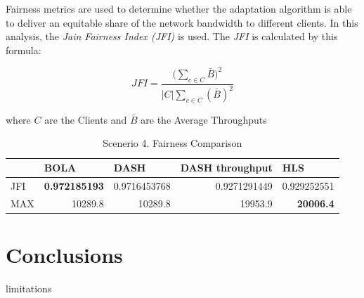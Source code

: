 Fairness metrics are used to determine whether the adaptation 
algorithm is able to deliver an equitable share of the network bandwidth 
to different clients. In this analysis, the \textit{Jain Fairness Index (JFI)}
\cite{jfi} is used. The \textit{JFI} is calculated by this formula:

\begin{equation}
    JFI=\frac{\bigg(\sum\limits_{c\in C}\bar{B}\bigg)^2}{\left | C \right |\sum\limits_{c\in C}(\bar{B})^2}
\end{equation}

where  $C$ are the Clients and $\bar{B}$ are the Average Throughputs

\begin{table}[]
    \centering
    \begin{tabular}{@{}lrrrr@{}}
    \toprule
        & \multicolumn{1}{l}{BOLA} & \multicolumn{1}{l}{DASH} & \multicolumn{1}{l}{DASH throughput} & \multicolumn{1}{l}{HLS} \\ \midrule
    JFI & \textbf{0.972185193}     & 0.9716453768             & 0.9271291449                        & 0.929252551             \\
    MAX & 10289.8                  & 10289.8                  & 19953.9                             & \textbf{20006.4}        \\ \bottomrule
    \end{tabular}
    \caption{Scenerio 4. Fairness Comparison}
\end{table}

\section{Conclusions}
\label{sec:simconclu}

limitations